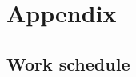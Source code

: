 
\section{Appendix} %
\label{sec:attachments}

\subsection{Work schedule}
\label{sub:work_scheduling}


